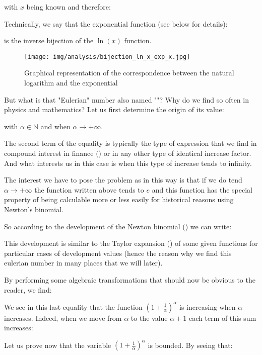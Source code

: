 	with $x$ being known and therefore:
	
	Technically, we say that the exponential function (see below for details):
	
	is the inverse bijection of the $\ln (x)$ function.
	\begin{figure}[H]
		\centering
		\texttt{[image: img/analysis/bijection\_ln\_x\_exp\_x.jpg]}
		\caption{Graphical representation of the correspondence between the natural logarithm and the exponential}
	\end{figure}
	But what is that "Eulerian" number also named "\label{Euler number}"? Why do we find so often in physics and mathematics? Let us first determine the origin of its value:
	
	with $\alpha \in \mathbb{N}$ and when $\alpha \rightarrow +\infty$.
	\begin{tcolorbox}[title=Remark,colframe=black,arc=10pt]
	The second term of the equality is typically the type of expression that we find in compound interest in finance () or in any other type of identical increase factor. And what interests us in this case is when this type of increase tends to infinity.
	\end{tcolorbox}
	The interest we have to pose the problem as in this way is that if we do tend $\alpha \rightarrow +\infty$ the function written above tends to $e$ and this function has the special property of being calculable more or less easily for historical reasons using Newton's binomial.
	
	So according to the development of the Newton binomial () we can write:
	
	This development is similar to the Taylor expansion () of some given functions for particular cases of development values (hence the reason why we find this eulerian number in many places that we will later).
	
	By performing some algebraic transformations that should now be obvious to the reader, we find:
	
	We see in this last equality that the function $\left(1+\frac{1}{\alpha}\right)^\alpha$ is increasing when $\alpha$ increases. Indeed, when we move from $\alpha$ to the value $\alpha+1$ each term of this sum increases:
	
	Let us prove now that the variable $\left(1+\frac{1}{\alpha}\right)^\alpha$ is bounded. By seeing that:
	
